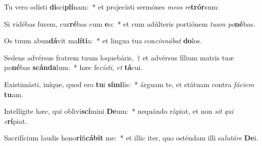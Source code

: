 \item Tu vero odísti \textbf{di}sci\textbf{plí}nam:~* et projecísti sermónes \textit{me}\textit{os} \textit{re}\textbf{trór}sum:
\item Si vidébas furem, cur\textbf{ré}bas cum \textbf{e}o:~* et cum adúlteris portiónem \textit{tu}\textit{am} \textit{po}\textbf{né}bas.
\item Os tuum abun\textbf{dá}vit ma\textbf{lí}\textbf{ti}a:~* et lingua tua con\textit{cin}\textit{ná}\textit{bat} \textbf{do}los.
\item Sedens advérsus fratrem tuum loquebáris,~† et advérsus fílium matris tuæ po\textbf{né}bas \textbf{scán}\textbf{da}lum:~* hæc fe\textit{cís}\textit{ti}, \textit{et} \textbf{tá}cui.
\item Existimásti, iníque, quod ero \textbf{tu}i \textbf{sí}\textbf{mi}lis:~* árguam te, et státuam contra \textit{fá}\textit{ci}\textit{em} \textbf{tu}am.
\item Intellígite hæc, qui oblivi\textbf{scí}mini \textbf{De}um:~* nequándo rápiat, et non \textit{sit} \textit{qui} \textit{e}\textbf{rí}piat.
\item Sacrifícium laudis hono\textbf{ri}fi\textbf{cá}\textbf{bit} me:~* et illic iter, quo osténdam illi sa\textit{lu}\textit{tá}\textit{re} \textbf{De}i.
